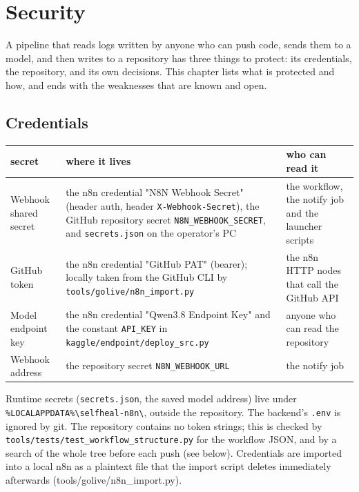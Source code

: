 \documentclass[11pt,a4paper]{report}
\begin{document}
\chapter{Security}

A pipeline that reads logs written by anyone who can push code, sends them to a model, and then writes to a repository has three things to protect: its credentials, the repository, and its own decisions. This chapter lists what is protected and how, and ends with the weaknesses that are known and open.

\section{Credentials}

\begin{longtable}{>{\raggedright\arraybackslash}p{0.157\dimexpr\linewidth-6\tabcolsep\relax}>{\raggedright\arraybackslash}p{0.448\dimexpr\linewidth-6\tabcolsep\relax}>{\raggedright\arraybackslash}p{0.396\dimexpr\linewidth-6\tabcolsep\relax}}
\toprule
\textbf{secret} & \textbf{where it lives} & \textbf{who can read it} \\
\midrule
\endhead
Webhook shared secret & the n8n credential "N8N Webhook Secret" (header auth, header \texttt{X-\allowbreak{}Webhook-\allowbreak{}Secret}), the GitHub repository secret \texttt{N8N\_\allowbreak{}WEBHOOK\_\allowbreak{}SECRET}, and \texttt{secrets.\allowbreak{}json} on the operator's PC & the workflow, the notify job and the launcher scripts \\
GitHub token & the n8n credential "GitHub PAT" (bearer); locally taken from the GitHub CLI by \texttt{tools/\allowbreak{}golive/\allowbreak{}n8n\_\allowbreak{}import.\allowbreak{}py} & the n8n HTTP nodes that call the GitHub API \\
Model endpoint key & the n8n credential "Qwen3.8 Endpoint Key" and the constant \texttt{API\_\allowbreak{}KEY} in \texttt{kaggle/\allowbreak{}endpoint/\allowbreak{}deploy\_\allowbreak{}src.\allowbreak{}py} & anyone who can read the repository \\
Webhook address & the repository secret \texttt{N8N\_\allowbreak{}WEBHOOK\_\allowbreak{}URL} & the notify job \\
\bottomrule
\end{longtable}

Runtime secrets (\texttt{secrets.\allowbreak{}json}, the saved model address) live under \texttt{\%LOCALAPPDATA\%\textbackslash{}selfheal-\allowbreak{}n8n\textbackslash{}}, outside the repository. The backend's \texttt{.\allowbreak{}env} is ignored by git. The repository contains no token strings; this is checked by \texttt{tools/\allowbreak{}tests/\allowbreak{}test\_\allowbreak{}workflow\_\allowbreak{}structure.\allowbreak{}py} for the workflow JSON, and by a search of the whole tree before each push (see below). Credentials are imported into a local n8n as a plaintext file that the import script deletes immediately afterwards (tools/golive/n8n\_import.py).
\end{document}
